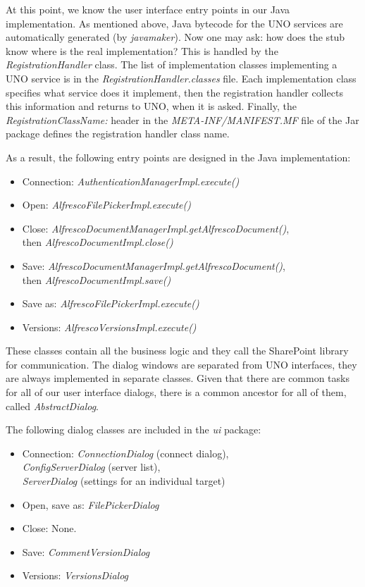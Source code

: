 At this point, we know the user interface entry points in our Java
implementation. As mentioned above, Java bytecode for the UNO services are
automatically generated (by \emph{javamaker}). Now one may ask: how does the
stub know where is the real implementation? This is handled by the
\emph{RegistrationHandler} class. The list of implementation classes
implementing a UNO service is in the \emph{RegistrationHandler.classes} file.
Each implementation class specifies what service does it implement, then the
registration handler collects this information and returns to UNO, when it is
asked. Finally, the \emph{RegistrationClassName:} header in the
\emph{META-INF/MANIFEST.MF} file of the Jar package defines the registration
handler class name.

As a result, the following entry points are designed in the Java
implementation:

\begin{itemize}
\item Connection: \emph{AuthenticationManagerImpl.execute()}
\item Open: \emph{AlfrescoFilePickerImpl.execute()}
\item Close: \emph{AlfrescoDocumentManagerImpl.getAlfrescoDocument()}, \\ then \emph{AlfrescoDocumentImpl.close()}
\item Save: \emph{AlfrescoDocumentManagerImpl.getAlfrescoDocument()}, \\ then \emph{AlfrescoDocumentImpl.save()}
\item Save as: \emph{AlfrescoFilePickerImpl.execute()}
\item Versions: \emph{AlfrescoVersionsImpl.execute()}
\end{itemize}

These classes contain all the business logic and they call the SharePoint
library for communication. The dialog windows are separated from UNO
interfaces, they are always implemented in separate classes. Given that there
are common tasks for all of our user interface dialogs, there is a common
ancestor for all of them, called \emph{AbstractDialog}.

The following dialog classes are included in the \emph{ui} package:

\begin{itemize}
\item Connection: \emph{ConnectionDialog} (connect dialog), \\
\emph{ConfigServerDialog} (server list), \\ \emph{ServerDialog} (settings for an
individual target)
\item Open, save as: \emph{FilePickerDialog}
\item Close: None.
\item Save: \emph{CommentVersionDialog}
\item Versions: \emph{VersionsDialog}
\end{itemize}


